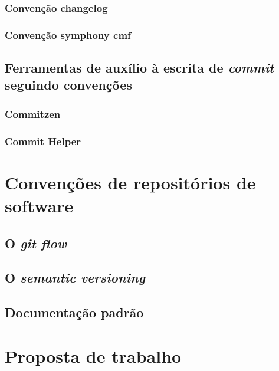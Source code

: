 



\subsubsection{Convenção changelog}





\subsubsection{Convenção symphony cmf}






\subsection{Ferramentas de auxílio à escrita de \textit{commit} seguindo convenções}
\subsubsection{Commitzen}
\subsubsection{Commit Helper} %




\newpage
\section{Convenções de repositórios de software}

\subsection{O \textit{git flow}}

\subsection{O \textit{semantic versioning}}

\subsection{Documentação padrão}



\newpage
\section{Proposta de trabalho}